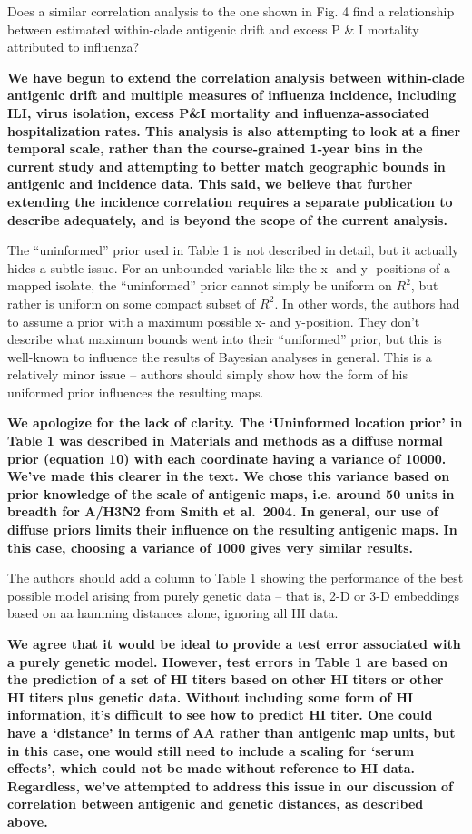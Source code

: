 \documentclass[11pt,oneside,letterpaper]{article}
\begin{document}
Does a similar correlation analysis to the one shown in Fig. 4 find a relationship between estimated within-clade antigenic drift and excess P \& I mortality attributed to influenza?

\textbf{We have begun to extend the correlation analysis between within-clade antigenic drift and multiple measures of influenza incidence, including ILI, virus isolation, excess P\&I mortality and influenza-associated hospitalization rates. This analysis is also attempting to look at a finer temporal scale, rather than the course-grained 1-year bins in the current study and attempting to better match geographic bounds in antigenic and incidence data.  This said, we believe that further extending the incidence correlation requires a separate publication to  describe adequately, and is beyond the scope of the current analysis.}

The ``uninformed'' prior used in Table 1 is not described in detail, but it actually hides a subtle issue. For an unbounded variable like the x- and y- positions of a mapped isolate, the ``uninformed'' prior cannot simply be uniform on $R^2$, but rather is uniform on some compact subset of $R^2$. In other words, the authors had to assume a prior with a maximum possible x- and y-position. They don't describe what maximum bounds went into their ``uniformed'' prior, but this is well-known to influence the results of Bayesian analyses in general. This is a relatively minor issue -- authors should simply show how the form of his uniformed prior influences the resulting maps.

\textbf{We apologize for the lack of clarity.  The `Uninformed location prior' in Table 1 was described in Materials and methods as a diffuse normal prior (equation 10) with each coordinate having a variance of 10000.  We've made this clearer in the text.  We chose this variance based on prior knowledge of the scale of antigenic maps, i.e. around 50 units in breadth for A/H3N2 from Smith et al.\ 2004.  In general, our use of diffuse priors limits their influence on the resulting antigenic maps.  In this case, choosing a variance of 1000 gives very similar results.}

The authors should add a column to Table 1 showing the performance of the best possible model arising from purely genetic data -- that is, 2-D or 3-D embeddings based on aa hamming distances alone, ignoring all HI data.

\textbf{We agree that it would be ideal to provide a test error associated with a purely genetic model.  However, test errors in Table 1 are based on the prediction of a set of HI titers based on other HI titers or other HI titers plus genetic data.  Without including some form of HI information, it's difficult to see how to predict HI titer.  One could have a `distance' in terms of AA rather than antigenic map units, but in this case, one would still need to include a scaling for `serum effects', which could not be made without reference to HI data.  Regardless, we've attempted to address this issue in our discussion of correlation between antigenic and genetic distances, as described above.}



\end{document}

